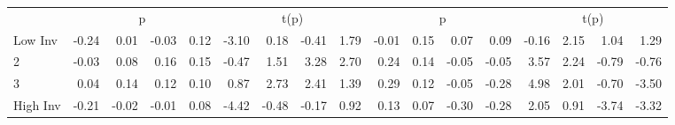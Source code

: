 \begin{table}[!ht]
\begin{tabular}{lrrrrrrrrrrrrrrrr}
  
     & \multicolumn{4}{c}{p} & \multicolumn{4}{c}{t(p)}  & \multicolumn{4}{c}{p} & \multicolumn{4}{c}{t(p)}   \\
     \cmidrule(r){2-5} \cmidrule(r){6-9}  \cmidrule(r){10-13} \cmidrule(r){14-17} 
    Low Inv  & -0.24  & 0.01  & -0.03  & 0.12  & -3.10  & 0.18  & -0.41  & 1.79  & -0.01  & 0.15  & 0.07  & 0.09  & -0.16  & 2.15  & 1.04  & 1.29   \\
    2  & -0.03  & 0.08  & 0.16  & 0.15  & -0.47  & 1.51  & 3.28  & 2.70  & 0.24  & 0.14  & -0.05  & -0.05  & 3.57  & 2.24  & -0.79  & -0.76   \\
    3  & 0.04  & 0.14  & 0.12  & 0.10  & 0.87  & 2.73  & 2.41  & 1.39  & 0.29  & 0.12  & -0.05  & -0.28  & 4.98  & 2.01  & -0.70  & -3.50   \\
    High Inv  & -0.21  & -0.02  & -0.01  & 0.08  & -4.42  & -0.48  & -0.17  & 0.92  & 0.13  & 0.07  & -0.30  & -0.28  & 2.05  & 0.91  & -3.74  & -3.32   \\
    
  
  \bottomrule
\end{tabular}
\label{tbl:32_Size_BM_Inv_B16}
\end{table}